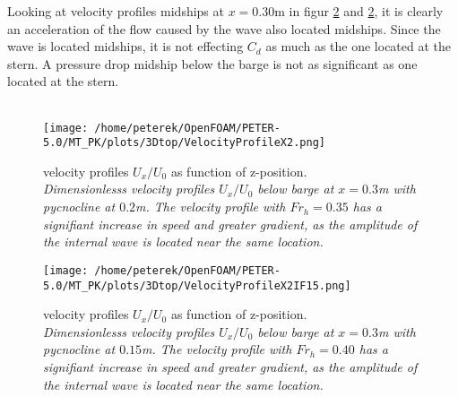 \documentclass[a4paper, 12pt]{report}
\begin{document}
Looking at velocity profiles midships at $x=0.30$m in figur \ref{fig:velocityProfileX2If15} and \ref{fig:velocityProfileX2If15}, it is clearly an acceleration of the flow caused by the wave also located midships. Since the wave is located midships, it is not effecting $C_d$ as much as the one located at the stern. A pressure drop midship below the barge is not as significant as one located at the stern.
\\
\\
\begin{minipage}[t]{.45\textwidth} 
	\begin{figure}[H]
		\centering
		\texttt{[image: /home/peterek/OpenFOAM/PETER-5.0/MT\_PK/plots/3Dtop/VelocityProfileX2.png]}
		\caption{velocity profiles $U_x/U_0$ as function of z-position. \\ \textit{Dimensionlesss velocity profiles $U_x/U_0$ below barge at $x = 0.3$m with pycnocline at $0.2$m. The velocity profile with $Fr_h = 0.35$ has a signifiant increase in speed and greater gradient, as the amplitude of the internal wave is located near the same location.}}
		\label{fig:velocityProfileX2If2}
	\end{figure}
\end{minipage}\hfill
\vspace{2ex}
\begin{minipage}[t]{.45\textwidth}
	\begin{figure}[H]
		\centering
		\texttt{[image: /home/peterek/OpenFOAM/PETER-5.0/MT\_PK/plots/3Dtop/VelocityProfileX2IF15.png]}
		\caption{velocity profiles $U_x/U_0$ as function of z-position. \\ \textit{Dimensionlesss velocity profiles $U_x/U_0$ below barge at $x = 0.3$m with pycnocline at $0.15$m. The velocity profile with $Fr_h = 0.40$ has a signifiant increase in speed and greater gradient, as the amplitude of the internal wave is located near the same location.}}
		\label{fig:velocityProfileX2If15}
	\end{figure}
\end{minipage}\hfill
\vspace{2ex}
\end{document}
